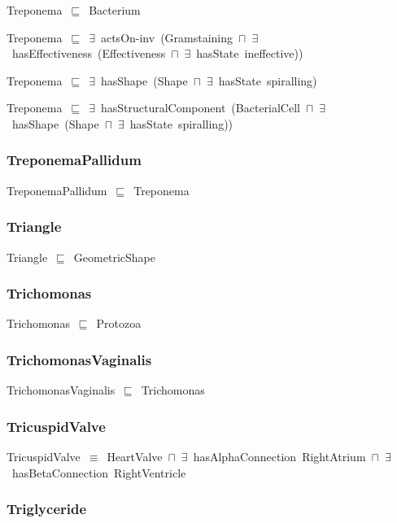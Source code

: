 \documentclass{article}
\begin{document}
Treponema~\ensuremath{\sqsubseteq}~Bacterium~

Treponema~\ensuremath{\sqsubseteq}~\ensuremath{\exists}~actsOn-inv~(Gramstaining~\ensuremath{\sqcap}~\ensuremath{\exists}~hasEffectiveness~(Effectiveness~\ensuremath{\sqcap}~\ensuremath{\exists}~hasState~ineffective))~

Treponema~\ensuremath{\sqsubseteq}~\ensuremath{\exists}~hasShape~(Shape~\ensuremath{\sqcap}~\ensuremath{\exists}~hasState~spiralling)~

Treponema~\ensuremath{\sqsubseteq}~\ensuremath{\exists}~hasStructuralComponent~(BacterialCell~\ensuremath{\sqcap}~\ensuremath{\exists}~hasShape~(Shape~\ensuremath{\sqcap}~\ensuremath{\exists}~hasState~spiralling))~

\subsubsection*{TreponemaPallidum}

TreponemaPallidum~\ensuremath{\sqsubseteq}~Treponema~

\subsubsection*{Triangle}

Triangle~\ensuremath{\sqsubseteq}~GeometricShape~

\subsubsection*{Trichomonas}

Trichomonas~\ensuremath{\sqsubseteq}~Protozoa~

\subsubsection*{TrichomonasVaginalis}

TrichomonasVaginalis~\ensuremath{\sqsubseteq}~Trichomonas~

\subsubsection*{TricuspidValve}

TricuspidValve~\ensuremath{\equiv}~HeartValve~\ensuremath{\sqcap}~\ensuremath{\exists}~hasAlphaConnection~RightAtrium~\ensuremath{\sqcap}~\ensuremath{\exists}~hasBetaConnection~RightVentricle

\subsubsection*{Triglyceride}
\end{document}
